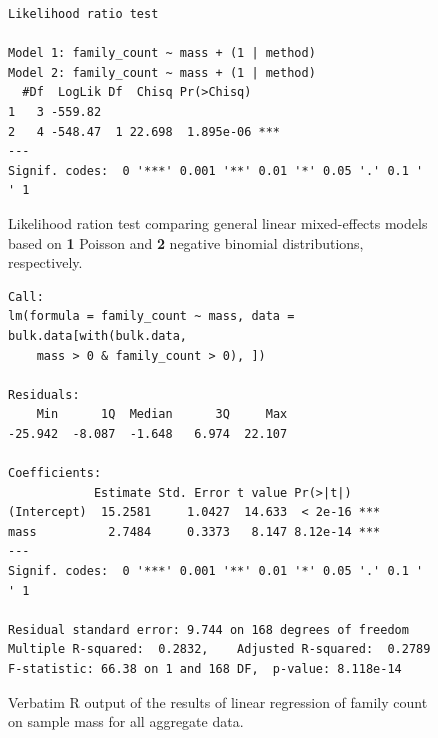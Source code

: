 \documentclass[10pt,letterpaper,twocolumn]{article}
\begin{document}
\begin{figure}[h]
	\lstset{numbers=left}
	\lstset{xleftmargin=5mm,framexleftmargin=5mm}
	\begin{lstlisting}
Likelihood ratio test

Model 1: family_count ~ mass + (1 | method)
Model 2: family_count ~ mass + (1 | method)
  #Df  LogLik Df  Chisq Pr(>Chisq)    
1   3 -559.82                         
2   4 -548.47  1 22.698  1.895e-06 ***
---
Signif. codes:  0 '***' 0.001 '**' 0.01 '*' 0.05 '.' 0.1 ' ' 1
	\end{lstlisting}
	\caption{Likelihood ration test comparing general linear mixed-effects models based on \textbf{1} Poisson and \textbf{2} negative binomial distributions, respectively.}
	\label{fig:bulk_glmm_lrt}
	\smallskip
	\nointerlineskip
	\hrulefill
\end{figure}

\begin{figure}[h]
	\lstset{numbers=left}
	\lstset{xleftmargin=5mm,framexleftmargin=5mm}
	\begin{lstlisting}
Call:
lm(formula = family_count ~ mass, data = bulk.data[with(bulk.data, 
    mass > 0 & family_count > 0), ])

Residuals:
    Min      1Q  Median      3Q     Max 
-25.942  -8.087  -1.648   6.974  22.107 

Coefficients:
            Estimate Std. Error t value Pr(>|t|)    
(Intercept)  15.2581     1.0427  14.633  < 2e-16 ***
mass          2.7484     0.3373   8.147 8.12e-14 ***
---
Signif. codes:  0 '***' 0.001 '**' 0.01 '*' 0.05 '.' 0.1 ' ' 1

Residual standard error: 9.744 on 168 degrees of freedom
Multiple R-squared:  0.2832,	Adjusted R-squared:  0.2789 
F-statistic: 66.38 on 1 and 168 DF,  p-value: 8.118e-14
	\end{lstlisting}
	\caption{Verbatim R output of the results of linear regression of family count on sample mass for all aggregate data.}
	\label{fig:bulk_lm}
	\smallskip
	\nointerlineskip
	\hrulefill
\end{figure}
\end{document}

